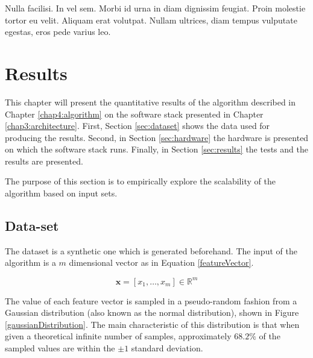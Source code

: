 \begin{savequote}[75mm] 
Nulla facilisi. In vel sem. Morbi id urna in diam dignissim feugiat. Proin molestie tortor eu velit. Aliquam erat volutpat. Nullam ultrices, diam tempus vulputate egestas, eros pede varius leo.
\end{savequote}

\chapter{Results \label{chap5:results}}

This chapter will present the quantitative results of the algorithm described in Chapter \ref{chap4:algorithm} on the software stack presented in Chapter \ref{chap3:architecture}. First, Section \ref{sec:dataset} shows the data used for producing the results. Second, in Section \ref{sec:hardware} the hardware is presented on which the software stack runs. Finally, in Section \ref{sec:results} the tests and the results are presented.

The purpose of this section is to empirically explore the scalability of the algorithm based on input sets.

\section{Data-set \label{sec:dataset}}

The dataset is a synthetic one which is generated beforehand. The input of the algorithm is a $m$ dimensional vector as in Equation \ref{featureVector}.

\begin{equation}
\textbf{x} = [x_{1},\ldots,x_{m}] \in \mathbb{R}^{m} \label{featureVector}
\end{equation}

The value of each feature vector is sampled in a pseudo-random fashion from a Gaussian distribution (also known as the normal distribution), shown in Figure \ref{gaussianDistribution}. The main characteristic of this distribution is that when given a theoretical infinite number of samples, approximately $68.2\%$ of the sampled values are within the $\pm 1$ standard deviation.

